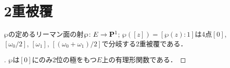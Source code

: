 \section{2重被覆}
\begin{Theorem}
    $\wp$の定めるリーマン面の射$\wp\colon E\to\mathbf{P}^1$; 
    $\wp([z])=[\wp(z):1]$は4点$[0]$, 
    $[\omega_0/2]$, $[\omega_1]$, 
    $[(\omega_0+\omega_1)/2]$で分岐する2重被覆である．
\end{Theorem}
\begin{proof}[\pfb]
    $\wp$は$[0]$にのみ2位の極をもつ$E$上の有理形関数である．
\end{proof}